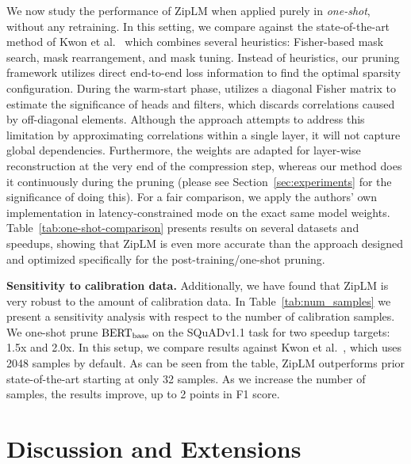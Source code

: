\documentclass{article}
\newcommand{\bertbase}{$\textrm{BERT}_{\small{\textrm{base}}}\,$}
\newcommand{\ourmethod}{ZipLM}
\theoremstyle{plain}
\theoremstyle{definition}
\theoremstyle{remark}
\renewcommand{\paragraph}[1]{ \noindent \textbf{#1}}
\begin{document}
 We now study the performance of \ourmethod{} when applied purely in \textit{one-shot}, without any retraining. In this setting, we compare against the state-of-the-art method of Kwon et al.~\cite{kwon2022fast} which combines several heuristics: Fisher-based mask search, mask rearrangement, and mask tuning. Instead of heuristics, our pruning framework utilizes direct end-to-end loss information to find the optimal sparsity configuration. During the warm-start phase, \cite{kwon2022fast} utilizes a diagonal Fisher matrix to estimate the significance of heads and filters, which discards correlations caused by off-diagonal elements. Although the approach attempts to address this limitation by approximating correlations within a single layer, it will not capture global dependencies. Furthermore, the weights are adapted for layer-wise reconstruction at the very end of the compression step, whereas our method does it continuously during the pruning (please see Section~\ref{sec:experiments} for the significance of doing this). 
 For a fair comparison, we apply the authors' own implementation in latency-constrained mode on the exact same model weights. Table~\ref{tab:one-shot-comparison} presents results on several datasets and speedups, showing that ZipLM is even more accurate than the approach designed and optimized specifically for the post-training/one-shot pruning.

\paragraph{Sensitivity to calibration data.} Additionally, we have found that ZipLM is very robust to the amount of calibration data. In Table~\ref{tab:num_samples} we present a sensitivity analysis with respect to the number of calibration samples. We one-shot prune \bertbase on the SQuADv1.1 task for two speedup targets: 1.5x and 2.0x. In this setup, we compare results against Kwon et al.~\cite{kwon2022fast}, which uses 2048 samples by default. As can be seen from the table, ZipLM outperforms prior state-of-the-art starting at only 32 samples. As we increase the number of samples, the results improve, up to 2 points in F1 score.

\vspace{-0.5em}
\section{Discussion and Extensions}
\label{lab:discussion}
\vspace{-0.5em}
\end{document}
